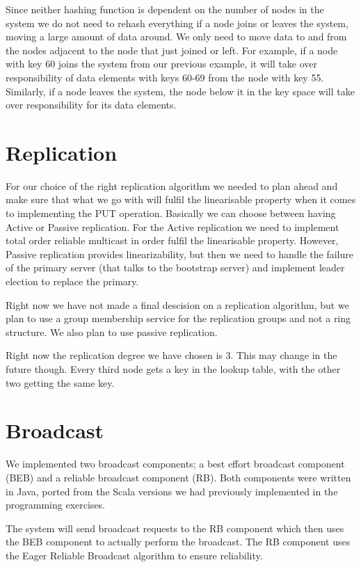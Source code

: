 \documentclass[a4paper, 11pt]{article}
\begin{document}
Since neither hashing function is dependent on the number of nodes in the system we do not need to rehash everything if a node joins or leaves the system, moving a large amount of data around. We only need to move data to and from the nodes adjacent to the node that just joined or left. For example, if a node with key 60 joins the system from our previous example, it will take over responsibility of data elements with keys 60-69 from the node with key 55. Similarly, if a node leaves the system, the node below it in the key space will take over responsibility for its data elements.

\section{Replication}

For our choice of the right replication algorithm we needed to plan ahead and make sure that what we go with will fulfil the linearisable property when it comes to implementing the PUT operation. Basically we can choose between having Active or Passive replication. For the Active replication we need to implement total order reliable multicast in order fulfil the linearisable property. However, Passive replication provides linearizability, but then we need to handle the failure of the primary server (that talks to the bootstrap server) and implement leader election to replace the primary.

Right now we have not made a final descision on a replication algorithm, but we plan to use a group membership service for the replication groups and not a ring structure. We also plan to use passive replication.

Right now the replication degree we have chosen is 3. This may change in the future though. Every third node gets a key in the lookup table, with the other two getting the same key.

\section{Broadcast}

We implemented two broadcast components; a best effort broadcast component (BEB) and a reliable broadcast component (RB). Both components were written in Java, ported from the Scala versions we had previously implemented in the programming exercises.

The system will send broadcast requests to the RB component which then uses the BEB component to actually perform the broadcast. The RB component uses the Eager Reliable Broadcast algorithm to ensure reliability.
\end{document}
